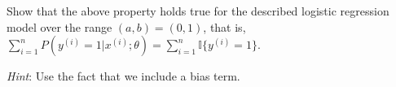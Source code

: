 \item {}
Show that the above property holds true for the described logistic regression
model over the range $(a,b) = (0,1)$, that is,  $\sum_{i=1}^{n}P(y^{(i)}=1|x^{(i)};\theta)=\sum_{i=1}^{n}\mathbb{I}\{y^{(i)}=1\}$.

\textit{Hint}: Use the fact that we include a bias term.

